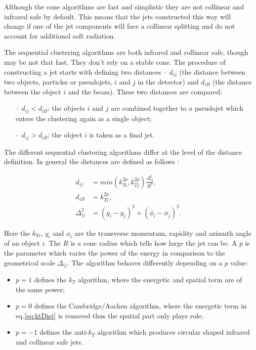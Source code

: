 Although the cone algorithms are fast and simplistic they are not collinear and infrared safe by default. This means that the jets constructed this way will
change if one of the jet components will face a collinear splitting and do not account for additional soft radiation.

The sequential clustering algorithms are both infrared and collinear safe, though may be not that fast. They don't rely on a stable cone. The procedure of constructing
a jet starts with defining two distances -- $d_{ij}$ (the distance between two objects, particles or pseudojets, $i$ and $j$ in the detector) and $d_{iB}$ (the distance between the object $i$
and the beam). These two distances are compared:

\begin{itemize}
 \item [--] $d_{ij} < d_{iB}$: the objects $i$ and $j$ are combined together to a pseudojet which enters the clustering again as a single object;
 \item [--] $d_{ij} > d_{iB}$: the object $i$ is taken as a final jet.
\end{itemize}

The different sequential clustering algorithms differ at the level of the distance definition. In general the distances are defined as follows \cite{Cacciari:2008gp}:

\begin{align}
 d_{ij} & = min(k_{Ti}^{2p}, k_{Tj}^{2p}) \frac{\Delta_{ij}^{2}}{R^{2}},\label{eq:ktDist} \\
 d_{iB} & = k_{Ti}^{2p}, \\
 \Delta_{ij}^{2} & = (y_{i} - y_{j})^{2} + (\phi_{i} - \phi_{j})^{2}.
\end{align}

Here the $k_{Ti}$, $y_{i}$ and $\phi_i$ are the transverse momentum, rapidity and azimuth angle of an object $i$. The $R$ is a cone radius which tells 
how large the jet can be. A $p$ is the parameter which varies the power of the energy in comparison to the geometrical scale $\Delta_{ij}$.
The algorithm behaves differently depending on a $p$ value:

\begin{itemize}
 \item $p = 1$ defines the $k_{T}$ algorithm, where the energetic and spatial term are of the same power;
 \item $p = 0$ defines the Cambridge/Aachen algorithm, where the energetic term in eq.\ref{eq:ktDist} is removed thus the spatial part only plays role;
 \item $p = -1$ defines the anti-$k_{T}$ algorithm which produces circular shaped infrared and collinear safe jets.
\end{itemize}

